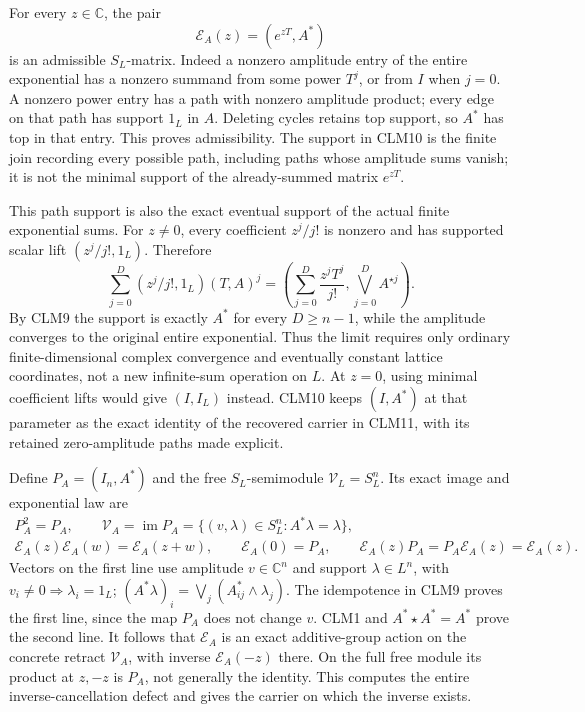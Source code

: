 \documentclass[11pt]{article}
\begin{document}
For every $z\in\mathbb C$, the pair
\begin{equation}\tag{CLM10}
\mathcal E_A(z)=(e^{zT},A^*)
\end{equation}
is an admissible $S_L$-matrix. Indeed a nonzero amplitude entry of the
entire exponential has a nonzero summand from some power $T^j$, or
from $I$ when $j=0$. A nonzero power entry has a path with nonzero
amplitude product; every edge on that path has support $1_L$ in $A$.
Deleting cycles retains top support, so $A^*$ has top in that entry.
This proves admissibility. The support in CLM10 is the finite
join recording every possible path, including paths whose amplitude
sums vanish; it is not the minimal support of the already-summed
matrix $e^{zT}$.

This path support is also the exact eventual support of the actual
finite exponential sums. For $z\ne0$, every coefficient $z^j/j!$ is
nonzero and has supported scalar lift $(z^j/j!,1_L)$. Therefore
\[
\sum_{j=0}^{D}(z^j/j!,1_L)(T,A)^j
 =\left(\sum_{j=0}^{D}\frac{z^jT^j}{j!},
         \bigvee_{j=0}^{D}A^{\star j}\right).
\]
By CLM9 the support is exactly $A^*$ for every $D\ge n-1$, while the
amplitude converges to the original entire exponential. Thus the
limit requires only ordinary finite-dimensional complex convergence
and eventually constant lattice coordinates, not a new infinite-sum
operation on $L$. At $z=0$, using minimal coefficient lifts would give
$(I,I_L)$ instead. CLM10 keeps $(I,A^*)$ at that parameter as the exact
identity of the recovered carrier in CLM11, with its retained
zero-amplitude paths made explicit.

Define $P_A=(I_n,A^*)$ and the free $S_L$-semimodule
$\mathcal V_L=S_L^n$. Its exact image and exponential law are
\begin{equation}\tag{CLM11}
\begin{gathered}
P_A^2=P_A,\qquad
\mathcal V_A=\operatorname{im}P_A
 =\{(v,\lambda)\in S_L^n:A^*\lambda=\lambda\},\\
\mathcal E_A(z)\mathcal E_A(w)=\mathcal E_A(z+w),\qquad
\mathcal E_A(0)=P_A,\qquad
\mathcal E_A(z)P_A=P_A\mathcal E_A(z)=\mathcal E_A(z).
\end{gathered}
\end{equation}
Vectors on the first line use amplitude $v\in\mathbb C^n$ and support
$\lambda\in L^n$, with $v_i\ne0\Rightarrow\lambda_i=1_L$;
$(A^*\lambda)_i=\bigvee_j(A^*_{ij}\wedge\lambda_j)$.
The idempotence in CLM9 proves the first line, since the map $P_A$
does not change $v$. CLM1 and $A^*\star A^*=A^*$ prove the second
line. It follows that $\mathcal E_A$ is an exact additive-group action
on the concrete retract $\mathcal V_A$, with inverse
$\mathcal E_A(-z)$ there. On the full free module its product at $z,-z$
is $P_A$, not generally the identity. This computes the entire
inverse-cancellation defect and gives the carrier on which the inverse
exists.
\end{document}
